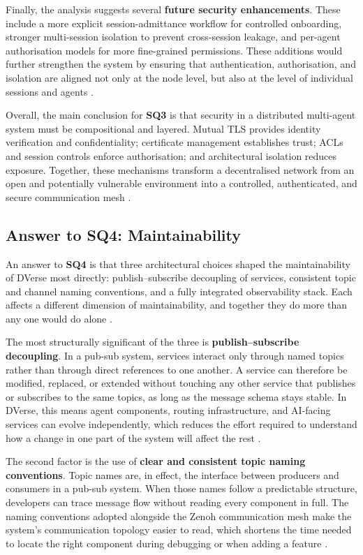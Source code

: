 \documentclass[11pt]{article}
\begin{document}
Finally, the analysis suggests several \textbf{future security enhancements}. These include a more explicit session-admittance workflow for controlled onboarding, stronger multi-session isolation to prevent cross-session leakage, and per-agent authorisation models for more fine-grained permissions. These additions would further strengthen the system by ensuring that authentication, authorisation, and isolation are aligned not only at the node level, but also at the level of individual sessions and agents \cite{mitev2026}.

Overall, the main conclusion for \textbf{SQ3} is that security in a distributed multi-agent system must be compositional and layered. Mutual TLS provides identity verification and confidentiality; certificate management establishes trust; ACLs and session controls enforce authorisation; and architectural isolation reduces exposure. Together, these mechanisms transform a decentralised network from an open and potentially vulnerable environment into a controlled, authenticated, and secure communication mesh \cite{mitev2026}.

\subsection{Answer to SQ4: Maintainability}

An answer to \textbf{SQ4} is that three architectural choices shaped the maintainability of DVerse most directly: publish--subscribe decoupling of services, consistent topic and channel naming conventions, and a fully integrated observability stack. Each affects a different dimension of maintainability, and together they do more than any one would do alone \cite{devanbu2000,bass2012}.

The most structurally significant of the three is \textbf{publish--subscribe decoupling}. In a pub-sub system, services interact only through named topics rather than through direct references to one another. A service can therefore be modified, replaced, or extended without touching any other service that publishes or subscribes to the same topics, as long as the message schema stays stable. In DVerse, this means agent components, routing infrastructure, and AI-facing services can evolve independently, which reduces the effort required to understand how a change in one part of the system will affect the rest \cite{eugster2003,bass2012}.

The second factor is the use of \textbf{clear and consistent topic naming conventions}. Topic names are, in effect, the interface between producers and consumers in a pub-sub system. When those names follow a predictable structure, developers can trace message flow without reading every component in full. The naming conventions adopted alongside the Zenoh communication mesh make the system's communication topology easier to read, which shortens the time needed to locate the right component during debugging or when adding a feature \cite{bass2012}.
\end{document}
